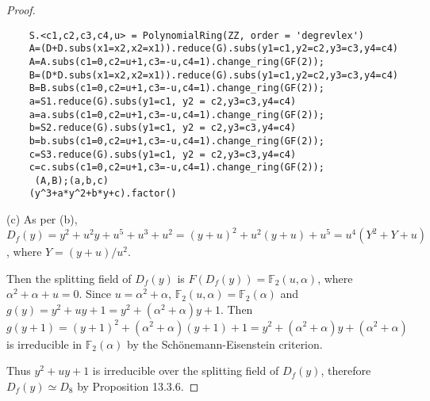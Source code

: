 \documentclass[11pt,a4paper]{article}
\begin{document}
{\begin{proof}
\begin{verbatim}
    S.<c1,c2,c3,c4,u> = PolynomialRing(ZZ, order = 'degrevlex')
    A=(D+D.subs(x1=x2,x2=x1)).reduce(G).subs(y1=c1,y2=c2,y3=c3,y4=c4)
    A=A.subs(c1=0,c2=u+1,c3=-u,c4=1).change_ring(GF(2));
    B=(D*D.subs(x1=x2,x2=x1)).reduce(G).subs(y1=c1,y2=c2,y3=c3,y4=c4)
    B=B.subs(c1=0,c2=u+1,c3=-u,c4=1).change_ring(GF(2));
    a=S1.reduce(G).subs(y1=c1, y2 = c2,y3=c3,y4=c4)
    a=a.subs(c1=0,c2=u+1,c3=-u,c4=1).change_ring(GF(2));
    b=S2.reduce(G).subs(y1=c1, y2 = c2,y3=c3,y4=c4)
    b=b.subs(c1=0,c2=u+1,c3=-u,c4=1).change_ring(GF(2));
    c=S3.reduce(G).subs(y1=c1, y2 = c2,y3=c3,y4=c4)
    c=c.subs(c1=0,c2=u+1,c3=-u,c4=1).change_ring(GF(2));
     (A,B);(a,b,c)
    (y^3+a*y^2+b*y+c).factor()
\end{verbatim}
\item[(c)] As per (b), $D_f(y)=y^2+u^2y+u^5+u^3+u^2=(y+u)^2+u^2(y+u)+u^5=u^4(Y^2+Y+u)$, where $Y=({y+u})/{u^2}$.

Then the splitting field of $D_f(y)$ is $F(D_f(y))=\mathbb{F}_2(u,\alpha)$, where $\alpha^2+\alpha+u=0$. Since $u=\alpha^2+\alpha$, $\mathbb{F}_2(u,\alpha)=\mathbb{F}_2(\alpha)$ and $g(y)=y^2+uy+1=y^2+(\alpha^2+\alpha)y+1$. Then $g(y+1)=(y+1)^2+(\alpha^2+\alpha)(y+1)+1=y^2+(\alpha^2+\alpha)y+(\alpha^2+\alpha)$ is irreducible in $\mathbb{F}_2(\alpha)$ by the Sch\"onemann-Eisenstein criterion.


Thus $y^2+uy+1$ is irreducible over the splitting field of $D_f(y)$, therefore $D_f(y)\simeq D_8$ by Proposition 13.3.6.
\end{proof}
}
\end{document}
